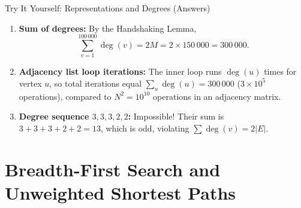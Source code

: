 \documentclass{beamer}
\begin{document}
\begin{frame}{Try It Yourself: Representations and Degrees (Answers)}
  \begin{enumerate}
    \item \textbf{Sum of degrees:} By the Handshaking Lemma,
      \[ \sum_{v=1}^{100\,000} \deg(v) = 2M = 2 \times 150\,000 = 300\,000. \]
    \item \textbf{Adjacency list loop iterations:} The inner loop runs $\deg(u)$ times for vertex $u$, so total iterations equal $\sum_u \deg(u) = 300\,000$ ($3 \times 10^5$ operations), compared to $N^2 = 10^{10}$ operations in an adjacency matrix.
    \item \textbf{Degree sequence $3, 3, 3, 2, 2$:} Impossible! Their sum is $3+3+3+2+2 = 13$, which is odd, violating $\sum \deg(v) = 2|E|$.
  \end{enumerate}
\end{frame}

\section{Breadth-First Search and Unweighted Shortest Paths}
\end{document}
